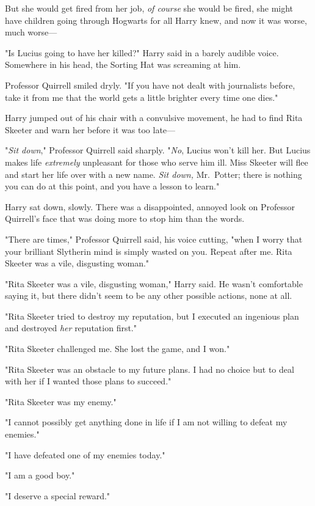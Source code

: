 But she would get fired from her job, \emph{of course} she would be fired, she 
might have children going through Hogwarts for all Harry knew, and now it was 
worse, much worse---

"Is Lucius going to have her killed?" Harry said in a barely audible voice. 
Somewhere in his head, the Sorting Hat was screaming at him.

Professor Quirrell smiled dryly. "If you have not dealt with journalists 
before, take it from me that the world gets a little brighter every time one 
dies."

Harry jumped out of his chair with a convulsive movement, he had to find Rita 
Skeeter and warn her before it was too late---

"\emph{Sit down}," Professor Quirrell said sharply. "\emph{No}, Lucius won't 
kill her. But Lucius makes life \emph{extremely} unpleasant for those who serve 
him ill. Miss Skeeter will flee and start her life over with a new name. 
\emph{Sit down,} Mr.~Potter; there is nothing you can do at this point, and you 
have a lesson to learn."

Harry sat down, slowly. There was a disappointed, annoyed look on Professor 
Quirrell's face that was doing more to stop him than the words.

"There are times," Professor Quirrell said, his voice cutting, "when I worry 
that your brilliant Slytherin mind is simply wasted on you. Repeat after me. 
Rita Skeeter was a vile, disgusting woman."

"Rita Skeeter was a vile, disgusting woman," Harry said. He wasn't comfortable 
saying it, but there didn't seem to be any other possible actions, none at all.

"Rita Skeeter tried to destroy my reputation, but I executed an ingenious plan 
and destroyed \emph{her} reputation first."

"Rita Skeeter challenged me. She lost the game, and I won."

"Rita Skeeter was an obstacle to my future plans. I had no choice but to deal 
with her if I wanted those plans to succeed."

"Rita Skeeter was my enemy."

"I cannot possibly get anything done in life if I am not willing to defeat my 
enemies."

"I have defeated one of my enemies today."

"I am a good boy."

"I deserve a special reward."

